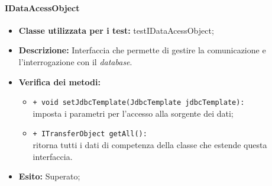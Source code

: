 \paragraph{IDataAcessObject}
\begin{flushleft}
\begin{itemize}
\item \textbf{Classe utilizzata per i test:} testIDataAcessObject;
\item \textbf{Descrizione:} Interfaccia che permette di gestire la comunicazione e l'interrogazione con il \textit{database}.
\item \textbf{Verifica dei metodi:}
\begin{sloppypar}
\begin{itemize}
\item \texttt{+ void setJdbcTemplate(JdbcTemplate jdbcTemplate):}\\ imposta i parametri per l'accesso alla sorgente dei dati;
\item \texttt{+ ITransferObject getAll():}\\ ritorna tutti i dati di competenza della classe che estende questa interfaccia.
\end{itemize}
\end{sloppypar}
\item \textbf{Esito:} Superato;
\end{itemize}
\end{flushleft}


